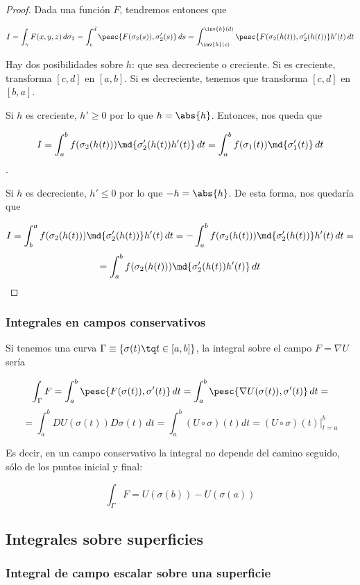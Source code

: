 \documentclass[nochap]{apuntes}
\begin{document}
\begin{proof}
Dada una función $F$, tendremos entonces que

\[ I = \int_\gamma F(x,y,z)\,d\sigma_2 = \int_c^d \pesc{F(\sigma_2(s)), \sigma_2'(s)}\, ds = \int_{\inv{h}(c)}^{\inv{h}(d)} \pesc{F(\sigma_2(h(t)), \sigma_2'(h(t))} h'(t) \,dt \]

Hay dos posibilidades sobre $h$: que sea decreciente o creciente. Si es creciente, transforma $[c,d]$ en $[a,b]$. Si es decreciente, tenemos que transforma $[c,d]$ en $[b,a]$.

Si $h$ es creciente, $h' ≥ 0$ por lo que $h = \abs{h}$. Entonces, nos queda que 

\[ I = \int_a^bf(\sigma_2(h(t)))\md{\sigma_2'(h(t))h'(t)}\,dt = \int_a^bf(\sigma_1(t))\md{\sigma_1'(t)}\,dt\].

Si $h$ es decreciente, $h' ≤ 0$ por lo que $-h = \abs{h}$. De esta forma, nos quedaría que

\[ I = \int_b^af(\sigma_2(h(t)))\md{\sigma_2'(h(t))}h'(t)\,dt = -\int_a^bf(\sigma_2(h(t)))\md{\sigma_2'(h(t))} h'(t)\,dt =\]\[ = \int_a^bf(\sigma_2(h(t)))\md{\sigma_2'(h(t))h'(t)}\,dt \]
\end{proof}

\subsubsection{Integrales en campos conservativos}

Si tenemos una curva $\Gamma \equiv \{\sigma(t) \tq t \in [a,b]\}$, la integral sobre el campo $F = \nabla U$ sería

\[ \int_\Gamma F = \int_a^b \pesc{F(\sigma(t)),\sigma'(t)}\,dt = \int_a^b \pesc{\nabla U (\sigma(t)),\sigma'(t)}\,dt = \]
\[ = \int_a^bDU(\sigma(t))D\sigma(t)\,dt = \int_a^b (U\circ\sigma)(t)dt = \left.(U\circ\sigma)(t)\right|_{t=a}^b \]

Es decir, en un campo conservativo la integral no depende del camino seguido, sólo de los puntos inicial y final:

\[ \int_\Gamma F = U(\sigma(b)) - U(\sigma(a)) \]

\subsection{Integrales sobre superficies}

\subsubsection{Integral de campo escalar sobre una superficie}
\end{document}
